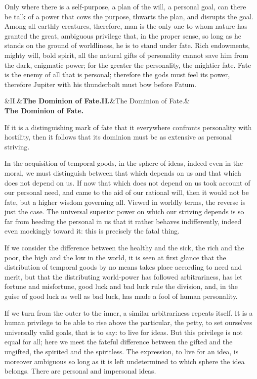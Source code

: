 \documentclass[12pt,a4paper,openany]{book}
\newcommand{\opage}[1]{\marginnote{\footnotesize\textit{[#1]}}}
\newcommand{\stykke}[2]{\begin{center}\ifx&#1&\textbf{#2}\else\textbf{#1}\ifx&#2&\else\\[0.2em]\textbf{#2}\fi\fi\end{center}}
\begin{document}
Only where there is a self-purpose, a plan
of the will, a personal goal, can there be
talk of a power that cows the purpose, thwarts
the plan, and disrupts the goal. Among all earthly creatures, therefore, man is the only one  %
\setcounter{footnote}{0}%
\opage{7}to whom nature has granted the great, ambiguous
privilege that, in the proper sense, so long as
he stands on the ground of worldliness,
he is to stand under fate. Rich endowments, mighty
will, bold spirit, all the natural gifts of
personality cannot save him from the
dark, enigmatic power; for the greater the personality,
the mightier fate. Fate is the enemy of all that is personal;
therefore the gods must feel its power, therefore
Jupiter with his thunderbolt must bow before Fatum.

\stykke{II.}{The Dominion of Fate.}

If it is a distinguishing mark of fate that it
everywhere confronts personality with hostility,
then it follows that its dominion
must be as extensive as personal
striving.

In the acquisition of temporal goods, in the sphere
of ideas, indeed even in the moral, we must
distinguish between that which depends on us and
that which does not depend on us. If now that
which does not depend on us took account of our
personal need, and came to the aid of our rational will,
\setcounter{footnote}{0}%
\opage{8}then it would not be fate, but a
higher wisdom governing all. Viewed in worldly terms,
the reverse is just the case. The universal
superior power on which our striving depends is
so far from heeding the personal in us that
it rather behaves indifferently, indeed
even mockingly toward it: this is precisely the fatal thing.

If we consider the difference between the healthy and the
sick, the rich and the poor, the high and the low in the world,
it is seen at first glance that the distribution
of temporal goods by no means takes place
according to need and merit, but that the distributing world-power has followed arbitrariness,
has let fortune and misfortune, good luck and bad luck rule
the division, and, in the guise of good luck as well as
bad luck, has made a fool of human personality.

If we turn from the outer to the inner, a similar arbitrariness
repeats itself.
It is a human privilege to be able to
rise above the particular, the petty,
to set ourselves universally valid goals, that is to say:
to live for ideas. But this privilege is not
equal for all; here we meet the fateful
difference between the gifted and the
\setcounter{footnote}{0}%
\opage{9}ungifted, the spirited and the spiritless. The
expression, to live for an idea, is moreover ambiguous
so long as it is left undetermined to which
sphere the idea belongs. There are personal
and impersonal ideas.
\end{document}
